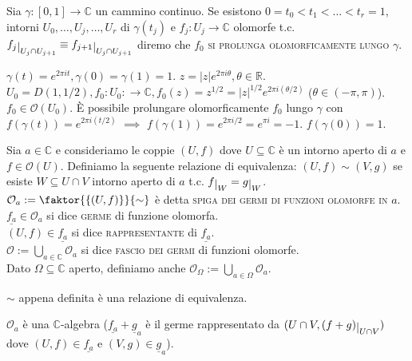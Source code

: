 \begin{defn}
  Sia $\gamma:[0, 1] \longrightarrow \mathbb{C}$ un cammino continuo.
  Se esistono $0=t_0<t_1<\dots<t_r=1$, intorni $U_0, \dots, U_j, \dots, U_r$ di $\gamma(t_j)$ e $f_j:U_j \longrightarrow \mathbb{C}$ olomorfe t.c. $f_j\restrict{U_j \cap U_{j+1}} \equiv f_{j+1}\restrict{U_j \cap U_{j+1}}$ diremo che \textsc{$f_0$ si prolunga olomorficamente lungo $\gamma$}.
\end{defn}

\begin{ex}
  $\gamma(t)=e^{2\pi i t}, \gamma(0)=\gamma(1)=1$. $z=|z|e^{2\pi i \theta}, \theta \in \mathbb{R}$. $U_0=D(1, 1/2), f_0:U_0: \longrightarrow \mathbb{C}, f_0(z)=z^{1/2}=|z|^{1/2}e^{2\pi i(\theta/2)}$ ($\theta \in (-\pi, \pi)$).
  $f_0 \in \mathcal{O}(U_0)$. È possibile prolungare olomorficamente $f_0$ lungo $\gamma$ con $f(\gamma(t))=e^{2\pi i(t/2)}$ $\implies$ $f(\gamma(1))=e^{2\pi i/2}=e^{\pi i}=-1$. $f(\gamma(0))=1$.
\end{ex}

\begin{defn}
  Sia $a \in \mathbb{C}$ e consideriamo le coppie $(U, f)$ dove $U \subseteq \mathbb{C}$ è un intorno aperto di $a$ e $f \in \mathcal{O}(U)$. Definiamo la seguente relazione di equivalenza: $(U, f) \sim (V, g)$ se esiste $W \subseteq U \cap V$ intorno aperto di $a$ t.c. $f\restrict{W}=g\restrict{W}$. \\
  $\mathcal{O}_a:=\faktor{\{(U, f)\}}{\sim}$ è detta \textsc{spiga dei germi di funzioni olomorfe in $a$}. \\
  $\underline{f_a} \in \mathcal{O}_a$ si dice \textsc{germe} di funzione olomorfa. \\
  $(U,f) \in \underline{f_a}$ si dice \textsc{rappresentante} di $\underline{f_a}$. \\
  $\displaystyle \mathcal{O}:=\bigcup_{a \in \mathbb{C}} \mathcal{O}_a$ si dice \textsc{fascio dei germi} di funzioni olomorfe. \\
  Dato $\Omega \subseteq \mathbb{C}$ aperto, definiamo anche $\displaystyle \mathcal{O}_{\Omega}:=\bigcup_{a \in \Omega} \mathcal{O}_a$.
\end{defn}

\begin{exc}
  $\sim$ appena definita è una relazione di equivalenza.
\end{exc}

\begin{exc}
  $\mathcal{O}_a$ è una $\mathbb{C}$-algebra ($\underline{f_a}+\underline{g}_a$ è il germe rappresentato da $(U \cap V, (f+g)\restrict{U \cap V})$ dove $(U,f) \in \underline{f_a}$ e $(V, g) \in \underline{g}_a$).
\end{exc}

